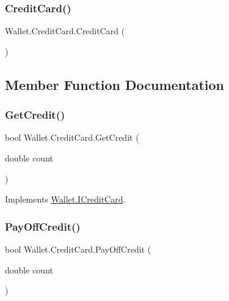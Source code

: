 \subsubsection{\texorpdfstring{Credit\+Card()}{CreditCard()}}
{\footnotesize\ttfamily Wallet.\+Credit\+Card.\+Credit\+Card (\begin{DoxyParamCaption}{ }\end{DoxyParamCaption})}



\subsection{Member Function Documentation}
\hypertarget{class_wallet_1_1_credit_card_a8907e7f7d9b2fcdf0fa84f0a76bc2b82}{}\label{class_wallet_1_1_credit_card_a8907e7f7d9b2fcdf0fa84f0a76bc2b82} 
\subsubsection{\texorpdfstring{Get\+Credit()}{GetCredit()}}
{\footnotesize\ttfamily bool Wallet.\+Credit\+Card.\+Get\+Credit (\begin{DoxyParamCaption}\item[{double}]{count }\end{DoxyParamCaption})}



Implements \hyperlink{interface_wallet_1_1_i_credit_card_aea5932ad7afdb08ee961fc0fcf694ab1}{Wallet.\+I\+Credit\+Card}.

\hypertarget{class_wallet_1_1_credit_card_a44cebe9c7bd0b962656364d80899b59e}{}\label{class_wallet_1_1_credit_card_a44cebe9c7bd0b962656364d80899b59e} 
\subsubsection{\texorpdfstring{Pay\+Off\+Credit()}{PayOffCredit()}}
{\footnotesize\ttfamily bool Wallet.\+Credit\+Card.\+Pay\+Off\+Credit (\begin{DoxyParamCaption}\item[{double}]{count }\end{DoxyParamCaption})}



